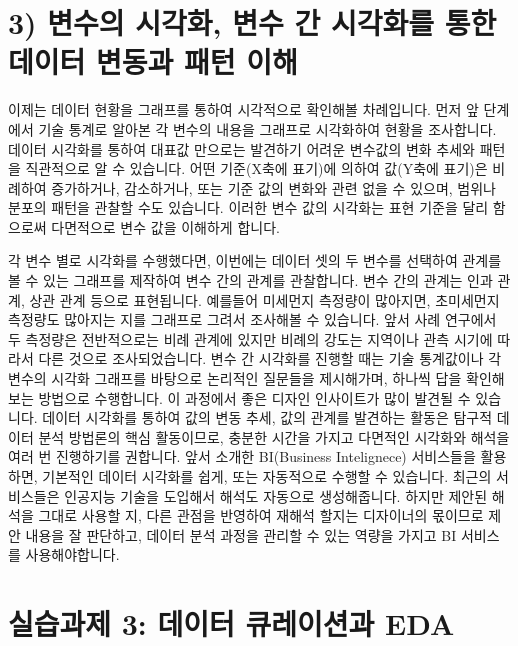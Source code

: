 \documentclass[
  letterpaper,
]{book}
\begin{document}
\section{3) 변수의 시각화, 변수 간 시각화를 통한 데이터 변동과 패턴
이해}\label{uxbcc0uxc218uxc758-uxc2dcuxac01uxd654-uxbcc0uxc218-uxac04-uxc2dcuxac01uxd654uxb97c-uxd1b5uxd55c-uxb370uxc774uxd130-uxbcc0uxb3d9uxacfc-uxd328uxd134-uxc774uxd574}

이제는 데이터 현황을 그래프를 통하여 시각적으로 확인해볼 차례입니다.
먼저 앞 단계에서 기술 통계로 알아본 각 변수의 내용을 그래프로 시각화하여
현황을 조사합니다. 데이터 시각화를 통하여 대표값 만으로는 발견하기
어려운 변수값의 변화 추세와 패턴을 직관적으로 알 수 있습니다. 어떤
기준(X축에 표기)에 의하여 값(Y축에 표기)은 비례하여 증가하거나,
감소하거나, 또는 기준 값의 변화와 관련 없을 수 있으며, 범위나 분포의
패턴을 관찰할 수도 있습니다. 이러한 변수 값의 시각화는 표현 기준을 달리
함으로써 다면적으로 변수 값을 이해하게 합니다.

각 변수 별로 시각화를 수행했다면, 이번에는 데이터 셋의 두 변수를
선택하여 관계를 볼 수 있는 그래프를 제작하여 변수 간의 관계를
관찰합니다. 변수 간의 관계는 인과 관계, 상관 관계 등으로 표현됩니다.
예를들어 미세먼지 측정량이 많아지면, 초미세먼지 측정량도 많아지는 지를
그래프로 그려서 조사해볼 수 있습니다. 앞서 사례 연구에서 두 측정량은
전반적으로는 비례 관계에 있지만 비례의 강도는 지역이나 관측 시기에
따라서 다른 것으로 조사되었습니다. 변수 간 시각화를 진행할 때는 기술
통계값이나 각 변수의 시각화 그래프를 바탕으로 논리적인 질문들을
제시해가며, 하나씩 답을 확인해보는 방법으로 수행합니다. 이 과정에서 좋은
디자인 인사이트가 많이 발견될 수 있습니다. 데이터 시각화를 통하여 값의
변동 추세, 값의 관계를 발견하는 활동은 탐구적 데이터 분석 방법론의 핵심
활동이므로, 충분한 시간을 가지고 다면적인 시각화와 해석을 여러 번
진행하기를 권합니다. 앞서 소개한 BI(Business Intelignece) 서비스들을
활용하면, 기본적인 데이터 시각화를 쉽게, 또는 자동적으로 수행할 수
있습니다. 최근의 서비스들은 인공지능 기술을 도입해서 해석도 자동으로
생성해줍니다. 하지만 제안된 해석을 그대로 사용할 지, 다른 관점을
반영하여 재해석 할지는 디자이너의 몫이므로 제안 내용을 잘 판단하고,
데이터 분석 과정을 관리할 수 있는 역량을 가지고 BI 서비스를
사용해야합니다.

\section{실습과제 3: 데이터 큐레이션과
EDA}\label{uxc2e4uxc2b5uxacfcuxc81c-3-uxb370uxc774uxd130-uxd050uxb808uxc774uxc158uxacfc-eda}
\end{document}

